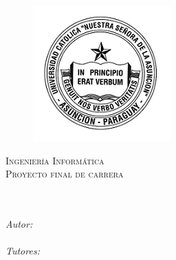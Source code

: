 \documentclass[
11pt, %
english, %
spanish,
singlespacing, %
liststotoc, %
parskip, %
headsepline, %
]{MastersDoctoralThesis} %
\author{Luis F. \textsc{Villalba V.}} %
\begin{document}
\frontmatter %
\pagestyle{plain} %


\begin{titlepage}
\begin{center}

\begin{figure}[H]
\centering
\includegraphics{Figuras/uca}
\decoRule
\end{figure}

{\scshape\LARGE \univname\par}\vspace{1cm} %
\textsc{\Large Ingeniería Informática\\[0.5cm] Proyecto final de carrera }\\[0.5cm] %

\HRule \\[0.4cm] %
{\huge \bfseries \ttitle\par}\vspace{0.4cm} %
\HRule \\[1cm] %

\Large \emph{Autor:}\\
\Large \href{}{\authorname} \\[5mm] %
\Large \emph{Tutores:}\\
\Large \href{}{\supname} \\[1cm]

\Large \facname\\ %
\Large \deptname \\[5mm]

{\large\the\year}\\[1cm] %

\end{center}
\end{titlepage}
\end{document}
